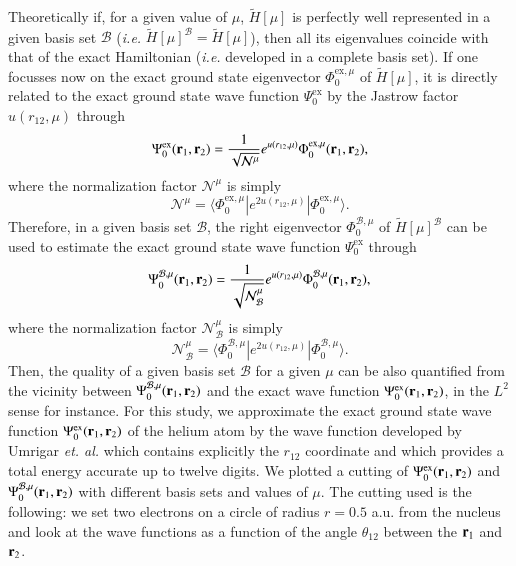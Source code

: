 \documentclass[aip,jcp,reprint,noshowkeys,superscriptaddress]{revtex4-1}
\newcommand{\matelem}[3]{\langle #1 | #2 | #3 \rangle}
\newcommand{\br}[0]{{\bf {r}}}
\newcommand{\bri}[1]{{\bf r}_{#1}}
\newcommand{\psiex}[0]{\Psi^{\text{ex}}_0}
\newcommand{\phimu}[0]{\Phi^{\text{ex},\mu}_0}
\newcommand{\phimub}[0]{\Phi^{\mathcal{B},\mu}_0}
\newcommand{\psimub}[0]{\Psi^{\mathcal{B},\mu}_0}
\newcommand{\basis}[0]{\mathcal{B}}
\begin{document}
Theoretically if, for a given value of $\mu$, $\tilde{H}[\mu]$ is perfectly well represented in a given basis set $\mathcal{B}$ (\textit{i.e.} $\tilde{H}[\mu]^{\basis} = \tilde{H}[\mu]$), then all its eigenvalues coincide with that of the exact Hamiltonian (\textit{i.e.} developed in a complete basis set). If one focusses now on the exact ground state eigenvector $\phimu$ of $\tilde{H}[\mu]$, it is directly related to the exact ground state wave function $\psiex$ by the Jastrow factor $u(r_{12},\mu)$ through 
\begin{equation}
 \psiex(\br{}_1,\br{}_2) =  \frac{1}{\sqrt{\mathcal{N}^{\mu}}} e^{u(r_{12},\mu)} \phimu(\br{}_1,\br{}_2), 
\end{equation}
where the normalization factor $\mathcal{N}^{\mu}$ is simply 
\begin{equation}
  \mathcal{N}^{\mu} = \matelem{\phimu}{e^{2 u(r_{12},\mu)}}{\phimu}.
\end{equation}
Therefore, in a given basis set $\basis$, the right eigenvector $\phimub$ of $\tilde{H}[\mu]^{\basis}$ can be used to estimate the exact ground state wave function $\psiex$ through 
\begin{equation}
 \psimub(\br{}_1,\br{}_2) = \frac{1}{\sqrt{\mathcal{N}_{\basis}^{\mu}}}e^{u(r_{12},\mu)}\phimub(\br{}_1,\br{}_2),
\end{equation}
where the normalization factor $\mathcal{N}_{\basis}^{\mu}$ is simply
\begin{equation}
  \mathcal{N}_{\basis}^{\mu} = \matelem{\phimub}{e^{2 u(r_{12},\mu)}}{\phimub}.
\end{equation}
Then, the quality of a given basis set $\basis$ for a given $\mu$ can be also quantified from the vicinity between $\psimub(\br{}_1,\br{}_2)$ and the exact wave function $\psiex(\br{}_1,\br{}_2)$, in the $L^2$ sense for instance. 
For this study, we approximate the exact ground state wave function $\psiex(\br{}_1,\br{}_2)$ of the helium atom by the wave function developed by Umrigar \textit{et. al.}\cite{UmrGon-PRA-94} which contains explicitly the $r_{12}$ coordinate and which provides a total energy accurate up to twelve digits.  
We plotted a cutting of $\psiex(\br{}_1,\br{}_2)$ and  $\psimub(\br{}_1,\br{}_2) $ with different basis sets and values of $\mu$. The cutting used is the following: we set two electrons on a circle of radius $r=0.5$ a.u. from the nucleus and look at the wave functions as a function of the angle $\theta_{12}$ between the $\bri{1}$ and $\bri{2}$. 
\end{document}
